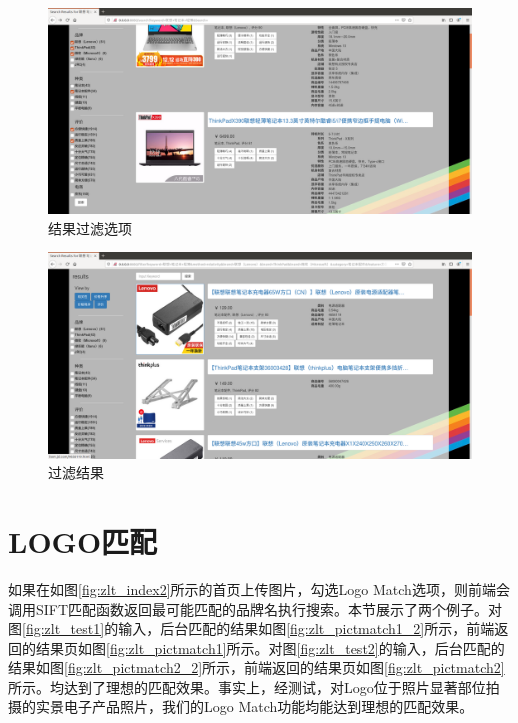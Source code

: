 \begin{figure}[htbp]
\centering
\includegraphics[width=13.5cm]{img/zlt/filter1.png}
\caption{结果过滤选项}
\label{fig:zlt_filter1}
\end{figure}

\begin{figure}[htbp]
\centering
\includegraphics[width=13.5cm]{img/zlt/filter1_result.png}
\caption{过滤结果}
\label{fig:zlt_filter1_result}
\end{figure}

\section{LOGO匹配}

如果在如图\ref{fig:zlt_index2}所示的首页上传图片，勾选Logo Match选项，则前端会调用SIFT匹配函数返回最可能匹配的品牌名执行搜索。本节展示了两个例子。对图\ref{fig:zlt_test1}的输入，后台匹配的结果如图\ref{fig:zlt_pictmatch1_2}所示，前端返回的结果页如图\ref{fig:zlt_pictmatch1}所示。对图\ref{fig:zlt_test2}的输入，后台匹配的结果如图\ref{fig:zlt_pictmatch2_2}所示，前端返回的结果页如图\ref{fig:zlt_pictmatch2}所示。均达到了理想的匹配效果。事实上，经测试，对Logo位于照片显著部位拍摄的实景电子产品照片，我们的Logo Match功能均能达到理想的匹配效果。

